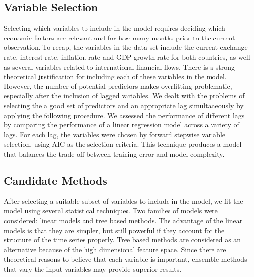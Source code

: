\documentclass{sig-alternate-05-2015}
\begin{document}
\subsection{Variable Selection}
Selecting which variables to include in the model requires deciding which economic factors are relevant and for how many months prior to the current observation. To recap, the variables in the data set include the current exchange rate, interest rate, inflation rate and GDP growth rate for both countries, as well as several variables related to international financial flows. There is a strong theoretical justification for including each of these variables in the model. However, the number of potential predictors makes overfitting problematic, especially after the inclusion of lagged variables. We dealt with the problems of selecting the a good set of predictors and an appropriate lag simultaneously by applying the following procedure. We assessed the performance of different lags by comparing the performance of a linear regression model across a variety of lags. For each lag, the variables were chosen by forward stepwise variable selection, using AIC as the selection criteria. This technique produces a model that balances the trade off between training error and model complexity.

\subsection{Candidate Methods}
After selecting a suitable subset of variables to include in the model, we fit the model using several statistical techniques. Two families of models were considered: linear models and tree based methods. The advantage of the linear models is that they are simpler, but still powerful if they account for the structure of the time series properly. Tree based methods are considered as an alternative because of the high dimensional feature space. Since there are theoretical reasons to believe that each variable is important, ensemble methods that vary the input variables may provide superior results.
\end{document}
